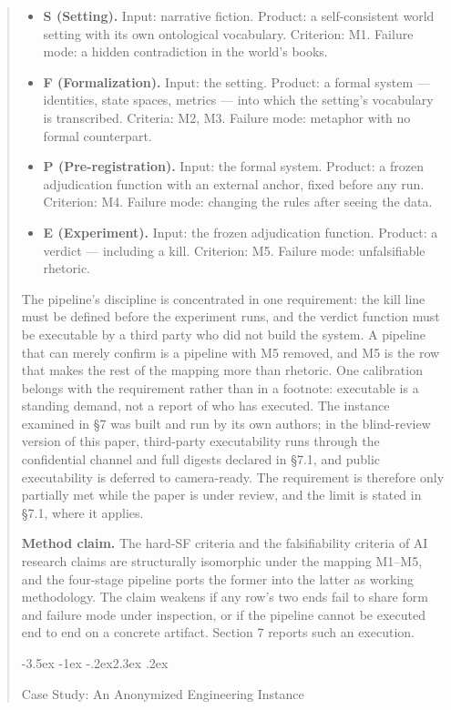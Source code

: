 \documentclass[11pt,a4paper]{article}
\makeatletter
\renewcommand\section{\@startsection{section}{1}{\z@}%
  {-3.5ex \@plus -1ex \@minus -.2ex}{2.3ex \@plus .2ex}%
  {\normalfont\Large\bfseries\raggedright}}
\makeatother
\begin{document}
\begin{abstract}
\begin{itemize}[leftmargin=1.6em,itemsep=2pt,parsep=0pt,topsep=3pt]
\item \textbf{S (Setting).} Input: narrative fiction. Product: a self-consistent world setting with its own ontological vocabulary. Criterion: M1. Failure mode: a hidden contradiction in the world's books.
\item \textbf{F (Formalization).} Input: the setting. Product: a formal system — identities, state spaces, metrics — into which the setting's vocabulary is transcribed. Criteria: M2, M3. Failure mode: metaphor with no formal counterpart.
\item \textbf{P (Pre-registration).} Input: the formal system. Product: a frozen adjudication function with an external anchor, fixed before any run. Criterion: M4. Failure mode: changing the rules after seeing the data.
\item \textbf{E (Experiment).} Input: the frozen adjudication function. Product: a verdict — including a kill. Criterion: M5. Failure mode: unfalsifiable rhetoric.
\end{itemize}

The pipeline's discipline is concentrated in one requirement: the kill line must be defined before the experiment runs, and the verdict function must be executable by a third party who did not build the system. A pipeline that can merely confirm is a pipeline with M5 removed, and M5 is the row that makes the rest of the mapping more than rhetoric. One calibration belongs with the requirement rather than in a footnote: executable is a standing demand, not a report of who has executed. The instance examined in §7 was built and run by its own authors; in the blind-review version of this paper, third-party executability runs through the confidential channel and full digests declared in §7.1, and public executability is deferred to camera-ready. The requirement is therefore only partially met while the paper is under review, and the limit is stated in §7.1, where it applies.

\textbf{Method claim.} The hard-SF criteria and the falsifiability criteria of AI research claims are structurally isomorphic under the mapping M1–M5, and the four-stage pipeline ports the former into the latter as working methodology. The claim weakens if any row's two ends fail to share form and failure mode under inspection, or if the pipeline cannot be executed end to end on a concrete artifact. Section 7 reports such an execution.

\section{Case Study: An Anonymized Engineering Instance}


\end{abstract}
\end{document}
